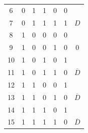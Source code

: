 \begin{center}
\begin{tabular}{ccccccc}
\multicolumn{1}{c|}{6}                           & 0                         & 1                         & 1                         & \multicolumn{1}{c|}{0}                         & \multicolumn{1}{c|}{0}                             &                                  \\
\multicolumn{1}{c|}{7}                           & 0                         & 1                         & 1                         & \multicolumn{1}{c|}{1}                         & \multicolumn{1}{c|}{1}                             & \multirow{-2}{*}{$D$}            \\ \hline
\multicolumn{1}{c|}{8}                           & 1                         & 0                         & 0                         & \multicolumn{1}{c|}{0}                         & \multicolumn{1}{c|}{0}                             &                                  \\
\multicolumn{1}{c|}{9}                           & 1                         & 0                         & 0                         & \multicolumn{1}{c|}{1}                         & \multicolumn{1}{c|}{0}                             & \multirow{-2}{*}{0}              \\ \hline
\multicolumn{1}{c|}{10}                          & 1                         & 0                         & 1                         & \multicolumn{1}{c|}{0}                         & \multicolumn{1}{c|}{1}                             &                                  \\
\multicolumn{1}{c|}{11}                          & 1                         & 0                         & 1                         & \multicolumn{1}{c|}{1}                         & \multicolumn{1}{c|}{0}                             & \multirow{-2}{*}{$\overline{D}$} \\ \hline
\multicolumn{1}{c|}{12}                          & 1                         & 1                         & 0                         & \multicolumn{1}{c|}{0}                         & \multicolumn{1}{c|}{1}                             &                                  \\
\multicolumn{1}{c|}{13}                          & 1                         & 1                         & 0                         & \multicolumn{1}{c|}{1}                         & \multicolumn{1}{c|}{0}                             & \multirow{-2}{*}{$\overline{D}$} \\ \hline
\multicolumn{1}{c|}{14}                          & 1                         & 1                         & 1                         & \multicolumn{1}{c|}{0}                         & \multicolumn{1}{c|}{1}                             &                                  \\
\multicolumn{1}{c|}{15}                          & 1                         & 1                         & 1                         & \multicolumn{1}{c|}{1}                         & \multicolumn{1}{c|}{0}                             & \multirow{-2}{*}{$\overline{D}$}
\end{tabular}
\end{center}
